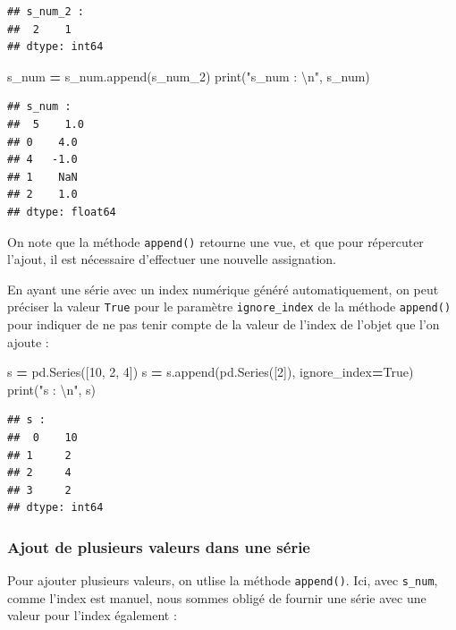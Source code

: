 \documentclass[12pt,]{book}
\newenvironment{Shaded}{\begin{snugshade}}{\end{snugshade}}
\newcommand{\DecValTok}[1]{\textcolor[rgb]{0.00,0.00,0.81}{#1}}
\newcommand{\CharTok}[1]{\textcolor[rgb]{0.31,0.60,0.02}{#1}}
\newcommand{\StringTok}[1]{\textcolor[rgb]{0.31,0.60,0.02}{#1}}
\newcommand{\VariableTok}[1]{\textcolor[rgb]{0.00,0.00,0.00}{#1}}
\newcommand{\OperatorTok}[1]{\textcolor[rgb]{0.81,0.36,0.00}{\textbf{#1}}}
\newcommand{\BuiltInTok}[1]{#1}
\newcommand{\NormalTok}[1]{#1}
\numberwithin{equation}{section}
\numberwithin{countremarque}{section}
\begin{document}
\begin{lstlisting}
## s_num_2 : 
##  2    1
## dtype: int64
\end{lstlisting}

\begin{Shaded}
\begin{Highlighting}[]
\NormalTok{s_num }\OperatorTok{=}\NormalTok{ s_num.append(s_num_2)}
\BuiltInTok{print}\NormalTok{(}\StringTok{"s_num : }\CharTok{\textbackslash{}n}\StringTok{"}\NormalTok{, s_num)}
\end{Highlighting}
\end{Shaded}

\begin{lstlisting}
## s_num : 
##  5    1.0
## 0    4.0
## 4   -1.0
## 1    NaN
## 2    1.0
## dtype: float64
\end{lstlisting}

On note que la méthode \texttt{append()} retourne une vue, et que pour
répercuter l'ajout, il est nécessaire d'effectuer une nouvelle
assignation.

En ayant une série avec un index numérique généré automatiquement, on
peut préciser la valeur \texttt{True} pour le paramètre
\texttt{ignore\_index} de la méthode \texttt{append()} pour indiquer de
ne pas tenir compte de la valeur de l'index de l'objet que l'on ajoute :

\begin{Shaded}
\begin{Highlighting}[]
\NormalTok{s }\OperatorTok{=}\NormalTok{ pd.Series([}\DecValTok{10}\NormalTok{, }\DecValTok{2}\NormalTok{, }\DecValTok{4}\NormalTok{])}
\NormalTok{s }\OperatorTok{=}\NormalTok{ s.append(pd.Series([}\DecValTok{2}\NormalTok{]), ignore_index}\OperatorTok{=}\VariableTok{True}\NormalTok{)}
\BuiltInTok{print}\NormalTok{(}\StringTok{"s : }\CharTok{\textbackslash{}n}\StringTok{"}\NormalTok{, s)}
\end{Highlighting}
\end{Shaded}

\begin{lstlisting}
## s : 
##  0    10
## 1     2
## 2     4
## 3     2
## dtype: int64
\end{lstlisting}

\subsubsection{Ajout de plusieurs valeurs dans une
série}\label{ajout-de-plusieurs-valeurs-dans-une-serie}

Pour ajouter plusieurs valeurs, on utlise la méthode \texttt{append()}.
Ici, avec \texttt{s\_num}, comme l'index est manuel, nous sommes obligé
de fournir une série avec une valeur pour l'index également :
\end{document}
